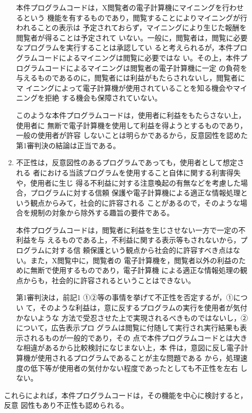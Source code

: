 \documentclass[12pt,a4paper]{ltjsarticle}
\begin{document}
\begin{enumerate}
\begin{enumerate}
               本件プログラムコードは，X閲覧者の電子計算機にマイニングを行わせるという
               機能を有するものであり，閲覧することによりマイニングが行われることの表示は
               予定されておらず，マイニングにより生じた報酬を閲覧者が得ることは予定されて
               いない。一般に，閲覧者は，閲覧に必要なプログラムを実行することは承認してい
               ると考えられるが，本件プログラムコードによるマイニングは閲覧に必要ではな
               い。その上，本件プログラムコードによるマイニングは閲覧者の電子計算機に一定
               の負荷を与えるものであるのに，閲覧者には利益がもたらされないし，閲覧者にマ
               イニングによって電子計算機が使用されていることを知る機会やマイニングを拒絶
               する機会も保障されていない。

               このような本件プログラムコードは，使用者に利益をもたらさない上，使用者に
               無断で電子計算機を使用して利益を得ようとするものであり，一般の使用者が許容
               しないことは明らかであるから，反意図性を認めた第1審判決の結論は正当である。

         \item 不正性は，反意図性のあるプログラムであっても，使用者として想定される
               者における当該プログラムを使用すること自体に関する利害得失や，使用者に生じ
               得る不利益に対する注意喚起の有無などを考慮した場合，プログラムに対する信頼
               保護や電子計算機による適正な情報処理という観点からみて，社会的に許容される
               ことがあるので，そのような場合を規制の対象から除外する趣旨の要件である。

               本件プログラムコードは，閲覧者に利益を生じさせない一方で一定の不利益を与
               えるものである上，不利益に関する表示等もされないから，プログラムに対する信
               頼保護という観点から社会的に許容すべき点はない。また，X閲覧中に，閲覧者の
               電子計算機を，閲覧者以外の利益のために無断で使用するものであり，電子計算機
               による適正な情報処理の観点からも，社会的に許容されるということはできない。

               第1審判決は，前記1 ①②等の事情を挙げて不正性を否定するが，①につい
               て，そのような利益は，意に反するプログラムの実行を使用者が気付かないような
               方法で受忍させた上で実現されるべきものではないし，②について，広告表示プロ
               グラムは閲覧に付随して実行され実行結果も表示されるものが一般的であり，その
               点で本件プログラムコードとは大きな相違があるから比較検討になじまない上，本
               件は，意図に反し電子計算機が使用されるプログラムであることが主な問題である
               から，処理速度の低下等が使用者の気付かない程度であったとしても不正性を左右
               しない。
        \end{enumerate}
        これらによれば，本件プログラムコードは，その機能を中心に検討すると，反意
        図性もあり不正性も認められる。
 \end{enumerate}
\end{document}
